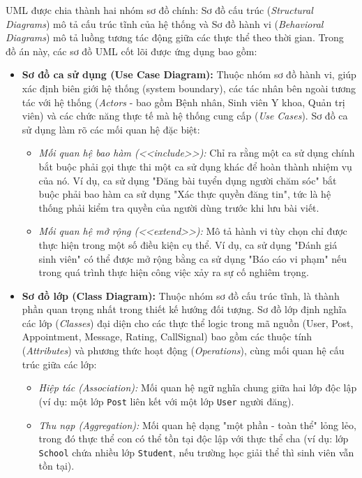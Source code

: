 \documentclass[a4paper,12pt]{report}
\begin{document}
UML được chia thành hai nhóm sơ đồ chính: Sơ đồ cấu trúc (\textit{Structural Diagrams}) mô tả cấu trúc tĩnh của hệ thống và Sơ đồ hành vi (\textit{Behavioral Diagrams}) mô tả luồng tương tác động giữa các thực thể theo thời gian. Trong đồ án này, các sơ đồ UML cốt lõi được ứng dụng bao gồm:
\begin{itemize}
    \item \textbf{Sơ đồ ca sử dụng (Use Case Diagram):} Thuộc nhóm sơ đồ hành vi, giúp xác định biên giới hệ thống (system boundary), các tác nhân bên ngoài tương tác với hệ thống (\textit{Actors} - bao gồm Bệnh nhân, Sinh viên Y khoa, Quản trị viên) và các chức năng thực tế mà hệ thống cung cấp (\textit{Use Cases}). Sơ đồ ca sử dụng làm rõ các mối quan hệ đặc biệt:
    \begin{itemize}
        \item \textit{Mối quan hệ bao hàm (\textless\textless include\textgreater\textgreater):} Chỉ ra rằng một ca sử dụng chính bắt buộc phải gọi thực thi một ca sử dụng khác để hoàn thành nhiệm vụ của nó. Ví dụ, ca sử dụng "Đăng bài tuyển dụng người chăm sóc" bắt buộc phải bao hàm ca sử dụng "Xác thực quyền đăng tin", tức là hệ thống phải kiểm tra quyền của người dùng trước khi lưu bài viết.
        \item \textit{Mối quan hệ mở rộng (\textless\textless extend\textgreater\textgreater):} Mô tả hành vi tùy chọn chỉ được thực hiện trong một số điều kiện cụ thể. Ví dụ, ca sử dụng "Đánh giá sinh viên" có thể được mở rộng bằng ca sử dụng "Báo cáo vi phạm" nếu trong quá trình thực hiện công việc xảy ra sự cố nghiêm trọng.
    \end{itemize}
    \item \textbf{Sơ đồ lớp (Class Diagram):} Thuộc nhóm sơ đồ cấu trúc tĩnh, là thành phần quan trọng nhất trong thiết kế hướng đối tượng. Sơ đồ lớp định nghĩa các lớp (\textit{Classes}) đại diện cho các thực thể logic trong mã nguồn (User, Post, Appointment, Message, Rating, CallSignal) bao gồm các thuộc tính (\textit{Attributes}) và phương thức hoạt động (\textit{Operations}), cùng mối quan hệ cấu trúc giữa các lớp:
    \begin{itemize}
        \item \textit{Hiệp tác (Association):} Mối quan hệ ngữ nghĩa chung giữa hai lớp độc lập (ví dụ: một lớp \texttt{Post} liên kết với một lớp \texttt{User} người đăng).
        \item \textit{Thu nạp (Aggregation):} Mối quan hệ dạng "một phần - toàn thể" lỏng lẻo, trong đó thực thể con có thể tồn tại độc lập với thực thể cha (ví dụ: lớp \texttt{School} chứa nhiều lớp \texttt{Student}, nếu trường học giải thể thì sinh viên vẫn tồn tại).

\end{itemize}
\end{itemize}
\end{document}
